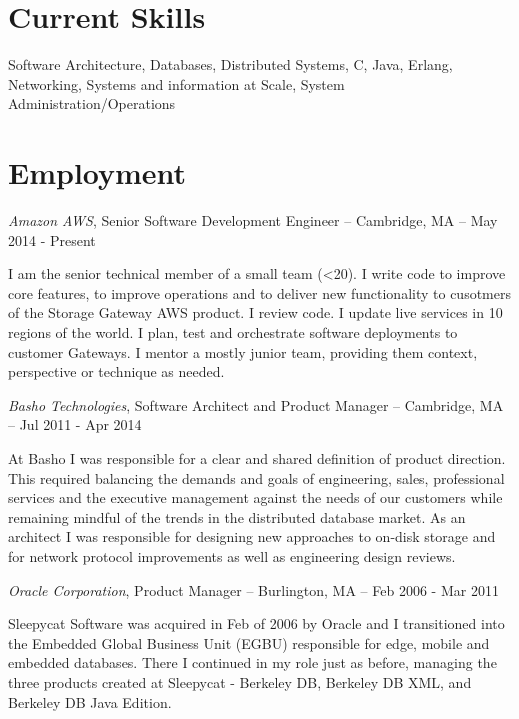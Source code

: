 \documentclass[letterpaper]{article}
\renewenvironment{itemize}{
  \begin{list}{}{
    \setlength{\leftmargin}{1.5em}
  }
}{
  \end{list}
}
\begin{document}
\section*{Current Skills}

\begin{itemize}
\item Software Architecture, Databases, Distributed Systems, C, Java, Erlang,
  Networking, Systems and information at Scale, System Administration/Operations
\end{itemize}


\section*{Employment}

\begin{itemize}
\item {\it Amazon AWS}, Senior Software Development Engineer -- Cambridge, MA -- May 2014 - Present

I am the senior technical member of a small team (<20). I write code to improve core
features, to improve operations and to deliver new functionality to cusotmers of the
Storage Gateway AWS product.  I review code.  I update live services in 10 regions of
the world.  I plan, test and orchestrate software deployments to customer Gateways.  I
mentor a mostly junior team, providing them context, perspective or technique as needed.

\begin{itemize}
\item {\it Basho Technologies}, Software Architect and Product Manager -- Cambridge, MA -- Jul 2011 - Apr 2014

At Basho I was responsible for a clear and shared definition of product direction.
This required balancing the demands and goals of engineering, sales, professional
services and the executive management against the needs of our customers while
remaining mindful of the trends in the distributed database market.  As an architect
I was responsible for designing new approaches to on-disk storage and for network
protocol improvements as well as engineering design reviews.

\begin{itemize}
\item {\it Oracle Corporation}, Product Manager -- Burlington, MA -- Feb 2006 - Mar 2011

Sleepycat Software was acquired in Feb of 2006 by Oracle and I transitioned
into the Embedded Global Business Unit (EGBU) responsible for edge, mobile and
embedded databases. There I continued in my role just as before, managing the
three products created at Sleepycat - Berkeley DB, Berkeley DB XML, and
Berkeley DB Java Edition.


\end{itemize}
\end{itemize}
\end{itemize}
\end{document}
